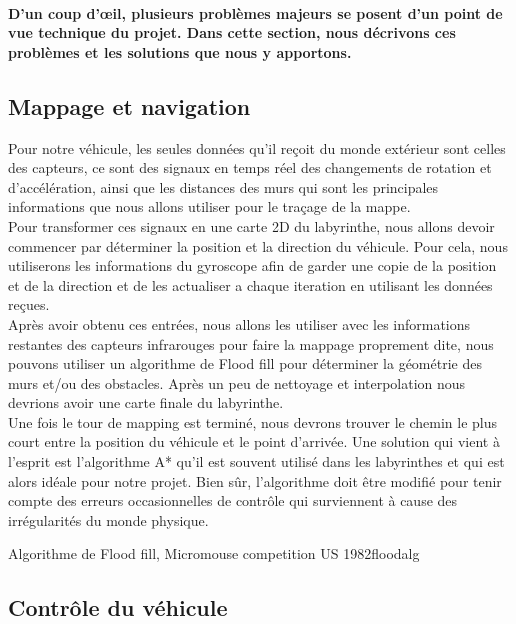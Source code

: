 \paragraph{
   D'un coup d'œil, plusieurs problèmes majeurs se posent d'un point de vue
technique du projet.  Dans cette section, nous décrivons ces problèmes et
les solutions que nous y apportons.}


\subsection{Mappage et navigation} \label{sec:rechChem} 

   Pour notre véhicule, les seules données qu'il reçoit du monde extérieur sont
celles des capteurs, ce sont des signaux en temps réel des changements de
rotation et d'accélération, ainsi que les distances des murs qui sont les
principales informations que nous allons utiliser pour le traçage de la mappe. \\

   Pour transformer ces signaux en une carte 2D du labyrinthe, nous allons devoir
commencer par déterminer la position et la direction du véhicule. Pour cela,
nous utiliserons les informations du gyroscope afin de garder une copie de la
position et de la direction et de les actualiser a chaque iteration en
utilisant les données reçues. \\

   Après avoir obtenu ces entrées, nous allons les utiliser avec les informations
restantes des capteurs infrarouges pour faire la mappage proprement dite, nous
pouvons utiliser un algorithme de Flood fill pour déterminer la géométrie des
murs et/ou des obstacles. Après un peu de nettoyage et interpolation nous
devrions avoir une carte finale du labyrinthe. \\

   Une fois le tour de mapping est terminé, nous devrons trouver le chemin le plus
court entre la position du véhicule et le point d'arrivée. Une solution qui
vient à l'esprit est l'algorithme A* qu'il est souvent utilisé dans les
labyrinthes et qui est alors idéale pour notre projet. Bien sûr, l'algorithme
doit être modifié pour tenir compte des erreurs occasionnelles de contrôle qui
surviennent à cause des irrégularités du monde physique.

{Algorithme de Flood fill, Micromouse competition US 1982}{floodalg}

\subsection{Contrôle du véhicule} \label{sec:ctrlComm}

